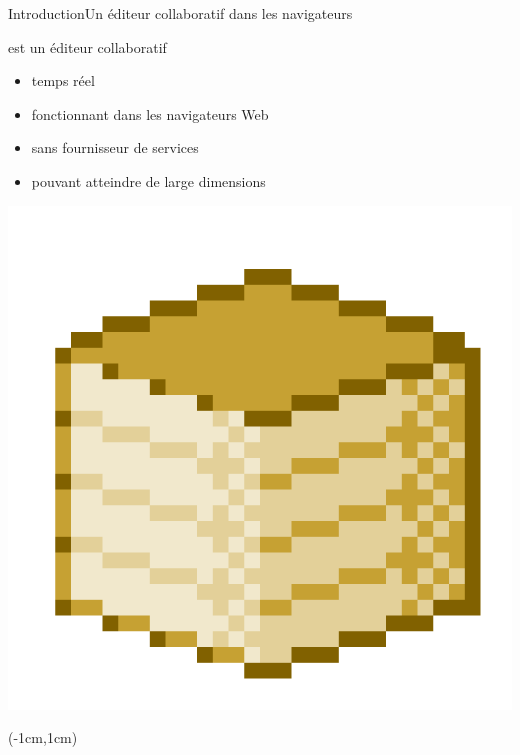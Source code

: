\begin{frame}{Introduction}{Un éditeur collaboratif dans les navigateurs}
  

  \begin{minipage}{0.69\textwidth}
    \CRATE est un éditeur collaboratif 
    \begin{itemize}
    \item temps réel \YES{\cmark}
    \item fonctionnant dans les navigateurs Web \YES{\cmark}
    \item sans fournisseur de services \YES{\cmark}
    \item pouvant atteindre de large dimensions \YES{\cmark}
    \end{itemize}
  \end{minipage}
  \begin{minipage}{0.3\textwidth}
    \includegraphics[width=\textwidth,interpolate=false]{img/crateicon.png}
  \end{minipage}
    
  
  \begin{textblock*}{1.18\textwidth}(-1cm,1cm)
  \end{textblock*}
  
  \vspace{1cm}

\end{frame}


